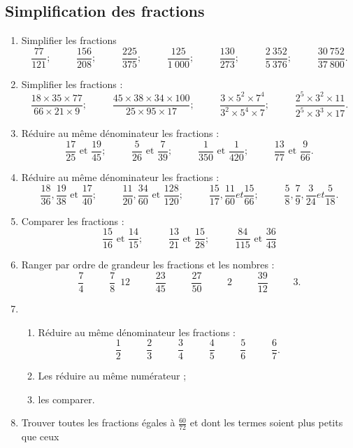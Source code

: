 \documentclass[12 pt]{extarticle}
\theoremstyle{plain}
\begin{document}
\subsection*{Simplification des fractions}

\begin{enumerate}
\item Simplifier les fractions 
\[ \frac{77}{121}; \phantom{meow}
\frac{156}{208};\phantom{meow}
\frac{225}{375};\phantom{meow}
\frac{125}{1~000};\phantom{meow}
\frac{130}{273}; \phantom{meow}
\frac{2~352}{5~376}; \phantom{meow}
\frac{30~752}{37~800}.\]
\item Simplifier les fractions : 
\[\frac{18\times 35\times77}{66\times 21\times9}; 
\phantom{meow} \frac{45\times 38\times 34\times 100}{25\times 95\times 17};\phantom{meow}\frac{3\times 5^2\times7^4}{3^2\times5^4\times 7};\phantom{meow}\frac{2^5\times3^2\times11}{2^5\times3^3\times17}.\]
\item Réduire au même dénominateur les fractions : 
\[ \frac{17}{25}\text{  et  }\frac{19}{45};\phantom{meow}
\frac{5}{26}\text{  et  }\frac{7}{39};\phantom{meow}
\frac1{350}\text{  et  }\frac1{420};\phantom{meow}
\frac{13}{77}\text{  et  }\frac{9}{66}.\]
\item Réduire au même dénominateur les fractions : 
\[\frac{18}{36}, \frac{19}{38}\text{  et  }\frac{17}{40}; \phantom{meow} 
\frac{11}{20}, \frac{34}{60} \text{  et  }\frac{128}{120}; \phantom{meow}
\frac{15}{17}, \frac{11}{60} et \frac{15}{66}; \phantom{meow}
\frac58, \frac79, \frac3{24} et \frac5{18}.\]
\item Comparer les fractions : \[\frac{15}{16}\text{  et  }\frac{14}{15}; \phantom{meow}\frac{13}{21}\text{  et  }\frac{15}{28}; \phantom{meow}\frac{84}{115}\text{  et  }\frac{36}{43}\]
\item Ranger par ordre de grandeur les fractions et les nombres : \[\frac74 \phantom{meow}\frac78\phantom{5}{12}\phantom{meow}\frac{23}{45}
\phantom{meow}\frac{27}{50}\phantom{meow}2\phantom{meow}\frac{39}{12}\phantom{meow}3.\]
\item \begin{enumerate}
\item Réduire au même dénominateur les fractions : 
\[\frac12\phantom{meow}\frac23\phantom{meow}\frac34
\phantom{meow}\frac45\phantom{meow}\frac56\phantom{meow}\frac67.\]
\item Les réduire au même numérateur ; 
\item les comparer. 
\end{enumerate}
\item Trouver toutes les fractions égales à $\frac{60}{72}$ et dont les termes soient plus petits que ceux

\end{enumerate}
\end{document}

